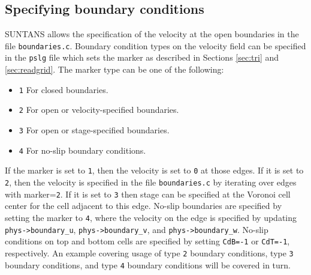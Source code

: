 \subsection{Specifying boundary conditions} \label{sec:boundary}

SUNTANS allows the specification of the velocity at the open boundaries in the file
\verb+boundaries.c+.  Boundary condition types on the velocity field can be specified in the \verb+pslg+ file
which sets the marker as described in Sections \ref{sec:tri} and \ref{sec:readgrid}.  The marker type
can be one of the following:
\begin{itemize}
\item \verb+1+ For closed boundaries.
\item \verb+2+ For open or velocity-specified boundaries.
\item \verb+3+ For open or stage-specified boundaries.
\item \verb+4+ For no-slip boundary conditions.
\end{itemize}
If the marker is set to \verb+1+, then the velocity is set to \verb+0+ at those edges.  If it is set to \verb+2+,
then the velocity is specified in the file \verb+boundaries.c+ by iterating over edges with marker=\verb+2+.
If it is set to \verb+3+ then stage can be specified at the Voronoi cell center for the cell adjacent to this edge. 
No-slip boundaries are specified by setting the marker to \verb+4+, where the velocity on the edge is specified by 
updating \verb+phys->boundary_u+, \verb+phys->boundary_v+, and \verb+phys->boundary_w+.  No-slip conditions on top and bottom cells are 
specified by setting \verb+CdB=-1+ or \verb+CdT=-1+, respectively.  An example covering usage of type \verb+2+ boundary conditions, type 
\verb+3+ boundary conditions, and type \verb+4+ boundary conditions will be covered in turn.

